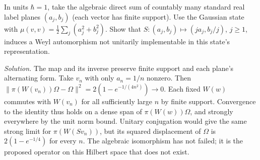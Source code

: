 \begin{exercise}\label{f:ex-implementation}
In units $\hbar=1$, take the algebraic direct sum of countably many standard real label planes $(a_j,b_j)$ (each vector has finite support). Use the Gaussian state with $\mu(v,v)=\tfrac12\sum_j(a_j^2+b_j^2)$. Show that $S:(a_j,b_j)\mapsto(ja_j,b_j/j)$, $j\ge1$, induces a Weyl automorphism not unitarily implementable in this state's representation.
\end{exercise}
\noindent\emph{Solution.} The map and its inverse preserve finite support and each plane's alternating form. Take $v_n$ with only $a_n=1/n$ nonzero. Then $\|\pi(W(v_n))\Omega-\Omega\|^2=2(1-e^{-1/(4n^2)})\to0$. Each fixed $W(w)$ commutes with $W(v_n)$ for all sufficiently large $n$ by finite support. Convergence to the identity thus holds on a dense span of $\pi(W(w))\Omega$, and strongly everywhere by the unit norm bound. Unitary conjugation would give the same strong limit for $\pi(W(Sv_n))$, but its squared displacement of $\Omega$ is $2(1-e^{-1/4})$ for every $n$. The algebraic isomorphism has not failed; it is the proposed operator on this Hilbert space that does not exist.
